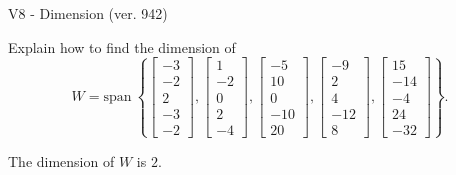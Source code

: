 \begin{exercise}
  \begin{exerciseTitle}V8 - Dimension (ver. 942)\end{exerciseTitle}
  \begin{exerciseStatement}
    Explain how to find the dimension of 
\[W=\mathrm{span}\ \left\{\left[\begin{array}{r}
-3 \\
-2 \\
2 \\
-3 \\
-2
\end{array}\right] , \left[\begin{array}{r}
1 \\
-2 \\
0 \\
2 \\
-4
\end{array}\right] , \left[\begin{array}{r}
-5 \\
10 \\
0 \\
-10 \\
20
\end{array}\right] , \left[\begin{array}{r}
-9 \\
2 \\
4 \\
-12 \\
8
\end{array}\right] , \left[\begin{array}{r}
15 \\
-14 \\
-4 \\
24 \\
-32
\end{array}\right]\right\}.\]



  \end{exerciseStatement}
  \begin{exerciseAnswer}
   The dimension of \(W\) is  \(2\).
  


  \end{exerciseAnswer}
\end{exercise}